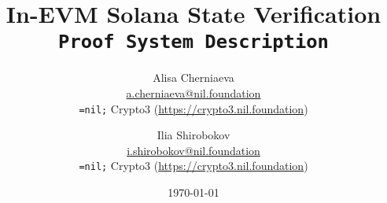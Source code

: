 \setlength{\droptitle}{-4\baselineskip} %

\pretitle{\begin{center}\Huge\bfseries} %
\title{In-EVM Solana State Verification \\ \texttt{Proof System Description}} %
\posttitle{\end{center}} %
\author{ %
	\protect\begin{tabular}{c} \normalsize Alisa Cherniaeva\\
	    \normalsize \href{mailto:a.cherniaeva@nil.foundation}{a.cherniaeva@nil.foundation} \\
	    \normalsize \texttt{=nil;} Crypto3 (\url{https://crypto3.nil.foundation})\\ 
	\protect\end{tabular}
	\and
	\protect\begin{tabular}{c} \normalsize Ilia Shirobokov\\
	    \normalsize \href{mailto:i.shirobokov@nil.foundation}{i.shirobokov@nil.foundation} \\
	    \normalsize \texttt{=nil;} Crypto3 (\url{https://crypto3.nil.foundation})\\ 
	\protect\end{tabular}
}
\date{\today} %
